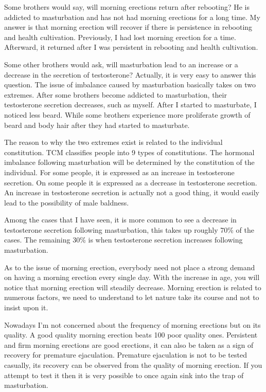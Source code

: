 \documentclass[
]{book}
\begin{document}
Some brothers would say, will morning erections return after rebooting? He is addicted to masturbation and has not had morning erections for a long time. My answer is that morning erection will recover if there is persistence in rebooting and health cultivation. Previously, I had lost morning erection for a time. Afterward, it returned after I was persistent in rebooting and health cultivation.

Some other brothers would ask, will masturbation lead to an increase or a decrease in the secretion of testosterone? Actually, it is very easy to answer this question. The issue of imbalance caused by masturbation basically takes on two extremes. After some brothers become addicted to masturbation, their testosterone secretion decreases, such as myself. After I started to masturbate, I noticed less beard. While some brothers experience more proliferate growth of beard and body hair after they had started to masturbate.

The reason to why the two extremes exist is related to the individual constitution. TCM classifies people into 9 types of constitutions. The hormonal imbalance following masturbation will be determined by the constitution of the individual. For some people, it is expressed as an increase in testosterone secretion. On some people it is expressed as a decrease in testosterone secretion. An increase in testosterone secretion is actually not a good thing, it would easily lead to the possibility of male baldness.

Among the cases that I have seen, it is more common to see a decrease in testosterone secretion following masturbation, this takes up roughly 70\% of the cases. The remaining 30\% is when testosterone secretion increases following masturbation.

As to the issue of morning erection, everybody need not place a strong demand on having a morning erection every single day. With the increase in age, you will notice that morning erection will steadily decrease. Morning erection is related to numerous factors, we need to understand to let nature take its course and not to insist upon it.

Nowadays I'm not concerned about the frequency of morning erections but on its quality. A good quality morning erection beats 100 poor quality ones. Persistent and firm morning erections are good erections, it can also be taken as a sign of recovery for premature ejaculation. Premature ejaculation is not to be tested casually, its recovery can be observed from the quality of morning erection. If you attempt to test it then it is very possible to once again sink into the trap of masturbation.
\end{document}

